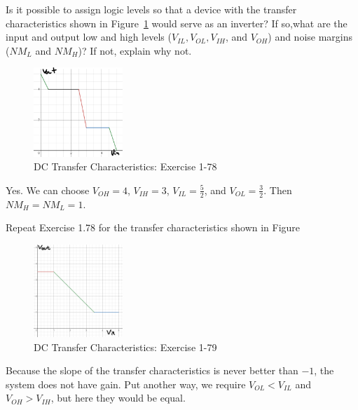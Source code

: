\documentclass[12pt]{article}
\newenvironment{ex}[2][Exercise]{\begin{trivlist}
		\item[\hskip \labelsep {\bfseries #1}\hskip \labelsep {\bfseries #2.}]}{\end{trivlist}}
\newenvironment{sol}[1][Solution]{\begin{trivlist}
		\item[\hskip \labelsep {\bfseries #1:}]}{\end{trivlist}}
\begin{document}
\begin{ex}{1.78}
	Is it possible to assign logic levels so that a device with the transfer characteristics shown in Figure~\ref{1-78} would serve as an inverter? If so,what are the input and output low and high levels ($V_{IL}, V_{OL}, V_{IH}$, and $V_{OH}$) and noise margins ($NM_{L}$ and $NM_H$)? If not, explain why not.
	\begin{figure}
		\centering
		\includegraphics[width=0.3\textwidth]{exercise-78}
		\caption{DC Transfer Characteristics: Exercise 1-78}
		\label{1-78}
	\end{figure}
\end{ex}

\begin{sol}
	Yes. We can choose $V_{OH}=4$, $V_{IH}=3$, $V_{IL}=\frac{5}{2}$, and $V_{OL}=\frac{3}{2}$. Then $NM_{H}=NM_{L}=1$.
\end{sol}

\begin{ex}{1.79}
	Repeat Exercise 1.78 for the transfer characteristics shown in Figure
	\begin{figure}
		\centering
		\includegraphics[width=0.3\textwidth]{exercise-1-79-transfer-characteristics}
		\caption{DC Transfer Characteristics: Exercise 1-79}
		\label{1-79}
	\end{figure}
\end{ex}

\begin{sol}
	Because the slope of the transfer characteristics is never better than $-1$, the system does not have gain. Put another way, we require $V_{OL}<V_{IL}$ and $V_{OH}>V_{IH}$, but here they would be equal.
\end{sol}

\end{document}
